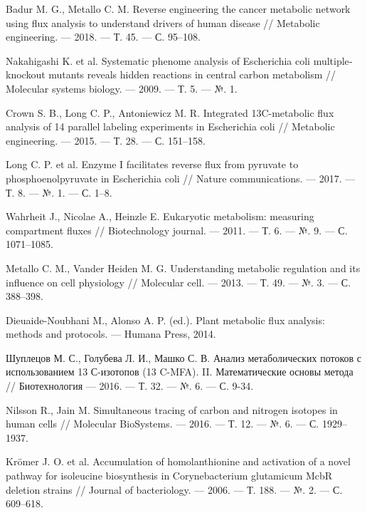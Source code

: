 \documentclass[14pt, a4paper]{extreport}
\begin{document}
\begin{thebibliography}{XXXX}
	Badur M. G., Metallo C. M. Reverse engineering the cancer metabolic network using flux analysis to understand drivers of human disease // Metabolic engineering. --- 2018. --- Т. 45. --- С. 95--108.
	
	Nakahigashi K. et al. Systematic phenome analysis of Escherichia coli multiple‐knockout mutants reveals hidden reactions in central carbon metabolism // Molecular systems biology. --- 2009. --- Т. 5. --- №. 1.
	
	Crown S. B., Long C. P., Antoniewicz M. R. Integrated 13C-metabolic flux analysis of 14 parallel labeling experiments in Escherichia coli // Metabolic engineering. --- 2015. --- Т. 28. --- С. 151--158.
	
	Long C. P. et al. Enzyme I facilitates reverse flux from pyruvate to phosphoenolpyruvate in Escherichia coli // Nature communications. --- 2017. --- Т. 8. --- №. 1. --- С. 1--8.
	
	Wahrheit J., Nicolae A., Heinzle E. Eukaryotic metabolism: measuring compartment fluxes // Biotechnology journal. --- 2011. --- Т. 6. --- №. 9. --- С. 1071--1085.
	
	Metallo C. M., Vander Heiden M. G. Understanding metabolic regulation and its influence on cell physiology // Molecular cell. --- 2013. --- Т. 49. --- №. 3. --- С. 388--398.
	
	Dieuaide-Noubhani M., Alonso A. P. (ed.). Plant metabolic flux analysis: methods and protocols. --- Humana Press, 2014.
	
	Шуплецов М. С., Голубева Л. И., Машко С. В. Анализ метаболических потоков с использованием 13 С-изотопов (13 C-MFA). II. Математические основы метода // Биотехнология --- 2016. --- Т. 32. --- №. 6. --- С. 9-34.
	
	Nilsson R., Jain M. Simultaneous tracing of carbon and nitrogen isotopes in human cells // Molecular BioSystems. --- 2016. --- Т. 12. --- №. 6. --- С. 1929--1937.
	
	Krömer J. O. et al. Accumulation of homolanthionine and activation of a novel pathway for isoleucine biosynthesis in Corynebacterium glutamicum McbR deletion strains // Journal of bacteriology. --- 2006. --- Т. 188. --- №. 2. --- С. 609--618.
	

\end{thebibliography}
\end{document}
